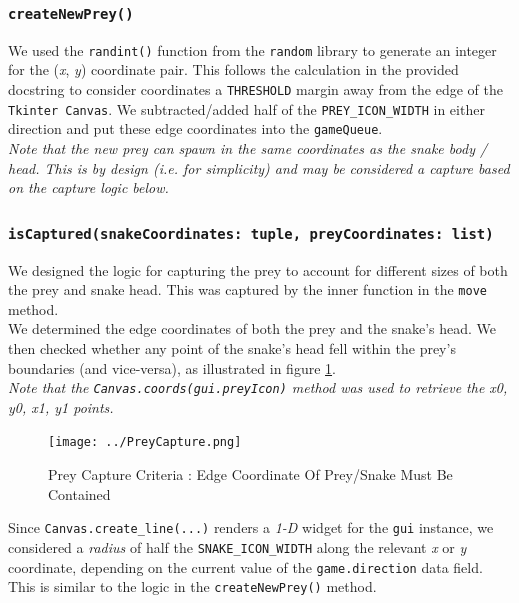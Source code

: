 \documentclass{article}
\begin{document}
\subsubsection{\texttt{createNewPrey()}}\label{sec:Prey_Generation}
We used the \texttt{randint()} function from the \texttt{random} library to generate an integer for the (\textit{x}, \textit{y}) coordinate pair. This follows the calculation
in the provided docstring to consider coordinates a \texttt{THRESHOLD} margin away from the edge of the \texttt{Tkinter Canvas}. We subtracted/added half of the \texttt{PREY\_ICON\_WIDTH}
in either direction and put these edge coordinates into the \texttt{gameQueue}. \\

\textit{Note that the new prey can spawn in the same coordinates as the snake body / head. This is by design (i.e. for simplicity) and may be considered a capture based on the capture logic below.}

\subsubsection{\texttt{isCaptured(snakeCoordinates: tuple, preyCoordinates: list)}}\label{sec:Prey_Capture}

We designed the logic for capturing the prey to account for different sizes of both the prey and snake head. This was captured by the inner function in the \texttt{move} method. \\

We determined the edge coordinates of both the prey and the snake's head. We then checked whether any point of the snake's head
fell within the prey's boundaries (and vice-versa), as illustrated in figure \ref{fig:PreyCapture}. \\

\textit{Note that the \texttt{Canvas.coords(gui.preyIcon)} method was used to retrieve the x0, y0, x1, y1 points.}

\begin{figure}[H]
   \centering
    \texttt{[image: ../PreyCapture.png]}
    \caption{Prey Capture Criteria : Edge Coordinate Of Prey/Snake Must Be Contained}
    \label{fig:PreyCapture}
\end{figure}

Since \texttt{Canvas.create\_line(...)} renders a \textit{1-D} widget
for the \texttt{gui} instance, we considered a \textit{radius} of half the \texttt{SNAKE\_ICON\_WIDTH} along the relevant \textit{x} or \textit{y} coordinate, depending on the current value of
the \texttt{game.direction} data field. This is similar to the logic in the \texttt{createNewPrey()} method.
\end{document}
